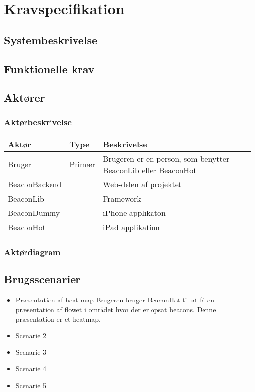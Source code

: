 \chapter{Kravspecifikation}
\label{ch:kravspecifikation}

\section{Systembeskrivelse}

\section{Funktionelle krav}
\section{Aktører}
\subsection{Aktørbeskrivelse}

\begin{table}[h]
\begin{tabular}{@{}lll@{}}
\toprule
\textbf{Aktør} & \textbf{Type} & \textbf{Beskrivelse}                                          \\ \midrule
Bruger         & Primær        & Brugeren er en person, som benytter BeaconLib eller BeaconHot \\ \midrule
BeaconBackend  &               & Web-delen af projektet                                        \\ \midrule
BeaconLib      &               & Framework                                                     \\ \midrule
BeaconDummy    &               & iPhone applikaton                                             \\ \midrule
BeaconHot      &               & iPad applikation                                              \\ \bottomrule
\end{tabular}
\end{table}

\subsection{Aktørdiagram}
\section{Brugsscenarier}
\begin{itemize}
\item Præsentation af heat map
Brugeren bruger BeaconHot til at få en præsentation af flowet i området hvor der er opsat beacons. Denne præsentation er et heatmap. 

\item Scenarie 2 
\item Scenarie 3 
\item Scenarie 4 
\item Scenarie 5 
\end{itemize}